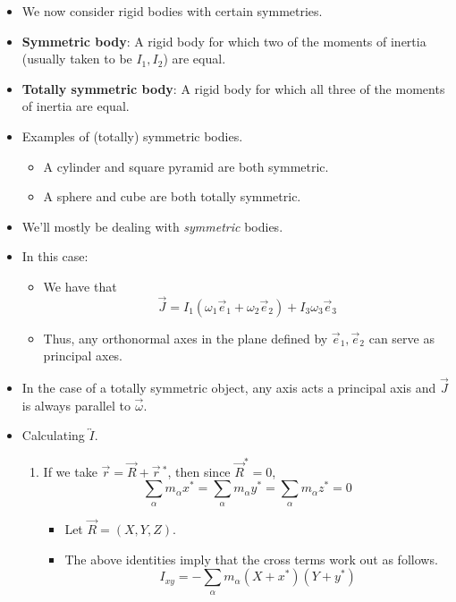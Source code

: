 \documentclass[../notes.tex]{subfiles}
\begin{document}
\begin{itemize}
    \item We now consider rigid bodies with certain symmetries.
    \item \textbf{Symmetric body}: A rigid body for which two of the moments of inertia (usually taken to be $I_1,I_2$) are equal.
    \item \textbf{Totally symmetric body}: A rigid body for which all three of the moments of inertia are equal.
    \item Examples of (totally) symmetric bodies.
    \begin{itemize}
        \item A cylinder and square pyramid are both symmetric.
        \item A sphere and cube are both totally symmetric.
    \end{itemize}
    \item We'll mostly be dealing with \emph{symmetric} bodies.
    \item In this case:
    \begin{itemize}
        \item We have that
        \begin{equation*}
            \vec{J} = I_1(\omega_1\vec{e}_1+\omega_2\vec{e}_2)+I_3\omega_3\vec{e}_3
        \end{equation*}
        \item Thus, any orthonormal axes in the plane defined by $\vec{e}_1,\vec{e}_2$ can serve as principal axes.
    \end{itemize}
    \item In the case of a totally symmetric object, any axis acts a principal axis and $\vec{J}$ is always parallel to $\vec{\omega}$.
    \item Calculating $\overleftrightarrow{I}$.
    \begin{enumerate}
        \item If we take $\vec{r}=\vec{R}+\vec{r}{\,}^*$, then since $\vec{R}^*=0$,
        \begin{equation*}
            \sum_\alpha m_\alpha x^* = \sum_\alpha m_\alpha y^* = \sum_\alpha m_\alpha z^* = 0
        \end{equation*}
        \begin{itemize}
            \item Let $\vec{R}=(X,Y,Z)$.
            \item The above identities imply that the cross terms work out as follows.
            \begin{equation*}
                I_{xy} = -\sum_\alpha m_\alpha(X+x^*)(Y+y^*)

\end{equation*}
\end{itemize}
\end{enumerate}
\end{itemize}
\end{document}
